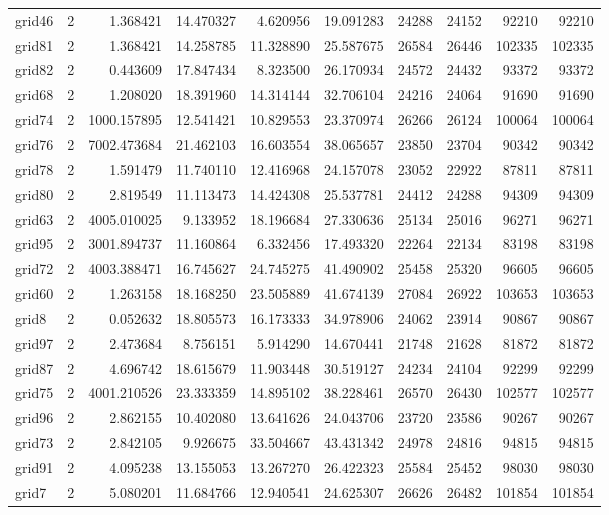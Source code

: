 \begin{longtable}{|l|r|r|r|r|r|r|r|r|r|}
grid46 & 2 & 1.368421 & 14.470327 & 4.620956 & 19.091283 & 24288 & 24152 & 92210 & 92210 \\
grid81 & 2 & 1.368421 & 14.258785 & 11.328890 & 25.587675 & 26584 & 26446 & 102335 & 102335 \\
grid82 & 2 & 0.443609 & 17.847434 & 8.323500 & 26.170934 & 24572 & 24432 & 93372 & 93372 \\
grid68 & 2 & 1.208020 & 18.391960 & 14.314144 & 32.706104 & 24216 & 24064 & 91690 & 91690 \\
grid74 & 2 & 1000.157895 & 12.541421 & 10.829553 & 23.370974 & 26266 & 26124 & 100064 & 100064 \\
grid76 & 2 & 7002.473684 & 21.462103 & 16.603554 & 38.065657 & 23850 & 23704 & 90342 & 90342 \\
grid78 & 2 & 1.591479 & 11.740110 & 12.416968 & 24.157078 & 23052 & 22922 & 87811 & 87811 \\
grid80 & 2 & 2.819549 & 11.113473 & 14.424308 & 25.537781 & 24412 & 24288 & 94309 & 94309 \\
grid63 & 2 & 4005.010025 & 9.133952 & 18.196684 & 27.330636 & 25134 & 25016 & 96271 & 96271 \\
grid95 & 2 & 3001.894737 & 11.160864 & 6.332456 & 17.493320 & 22264 & 22134 & 83198 & 83198 \\
grid72 & 2 & 4003.388471 & 16.745627 & 24.745275 & 41.490902 & 25458 & 25320 & 96605 & 96605 \\
grid60 & 2 & 1.263158 & 18.168250 & 23.505889 & 41.674139 & 27084 & 26922 & 103653 & 103653 \\
grid8 & 2 & 0.052632 & 18.805573 & 16.173333 & 34.978906 & 24062 & 23914 & 90867 & 90867 \\
grid97 & 2 & 2.473684 & 8.756151 & 5.914290 & 14.670441 & 21748 & 21628 & 81872 & 81872 \\
grid87 & 2 & 4.696742 & 18.615679 & 11.903448 & 30.519127 & 24234 & 24104 & 92299 & 92299 \\
grid75 & 2 & 4001.210526 & 23.333359 & 14.895102 & 38.228461 & 26570 & 26430 & 102577 & 102577 \\
grid96 & 2 & 2.862155 & 10.402080 & 13.641626 & 24.043706 & 23720 & 23586 & 90267 & 90267 \\
grid73 & 2 & 2.842105 & 9.926675 & 33.504667 & 43.431342 & 24978 & 24816 & 94815 & 94815 \\
grid91 & 2 & 4.095238 & 13.155053 & 13.267270 & 26.422323 & 25584 & 25452 & 98030 & 98030 \\
grid7 & 2 & 5.080201 & 11.684766 & 12.940541 & 24.625307 & 26626 & 26482 & 101854 & 101854 \\

\end{longtable}
